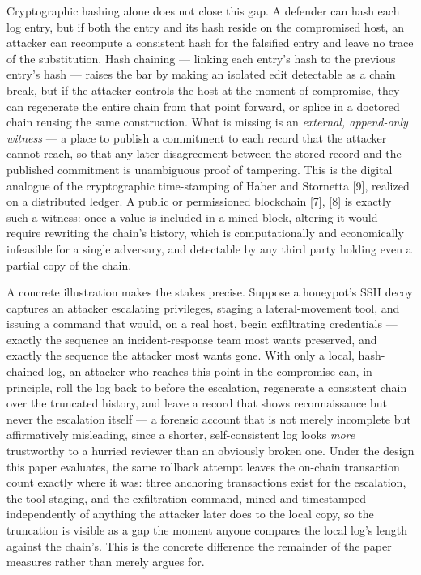 \documentclass[journal]{IEEEtran}
\begin{document}
Cryptographic hashing alone does not close this gap. A defender can hash each log entry, but if both the entry and its hash reside on the compromised host, an attacker can recompute a consistent hash for the falsified entry and leave no trace of the substitution. Hash chaining --- linking each entry's hash to the previous entry's hash --- raises the bar by making an isolated edit detectable as a chain break, but if the attacker controls the host at the moment of compromise, they can regenerate the entire chain from that point forward, or splice in a doctored chain reusing the same construction. What is missing is an \emph{external, append-only witness} --- a place to publish a commitment to each record that the attacker cannot reach, so that any later disagreement between the stored record and the published commitment is unambiguous proof of tampering. This is the digital analogue of the cryptographic time-stamping of Haber and Stornetta [9], realized on a distributed ledger. A public or permissioned blockchain [7], [8] is exactly such a witness: once a value is included in a mined block, altering it would require rewriting the chain's history, which is computationally and economically infeasible for a single adversary, and detectable by any third party holding even a partial copy of the chain.

A concrete illustration makes the stakes precise. Suppose a honeypot's SSH decoy captures an attacker escalating privileges, staging a lateral-movement tool, and issuing a command that would, on a real host, begin exfiltrating credentials --- exactly the sequence an incident-response team most wants preserved, and exactly the sequence the attacker most wants gone. With only a local, hash-chained log, an attacker who reaches this point in the compromise can, in principle, roll the log back to before the escalation, regenerate a consistent chain over the truncated history, and leave a record that shows reconnaissance but never the escalation itself --- a forensic account that is not merely incomplete but affirmatively misleading, since a shorter, self-consistent log looks \emph{more} trustworthy to a hurried reviewer than an obviously broken one. Under the design this paper evaluates, the same rollback attempt leaves the on-chain transaction count exactly where it was: three anchoring transactions exist for the escalation, the tool staging, and the exfiltration command, mined and timestamped independently of anything the attacker later does to the local copy, so the truncation is visible as a gap the moment anyone compares the local log's length against the chain's. This is the concrete difference the remainder of the paper measures rather than merely argues for.
\end{document}
